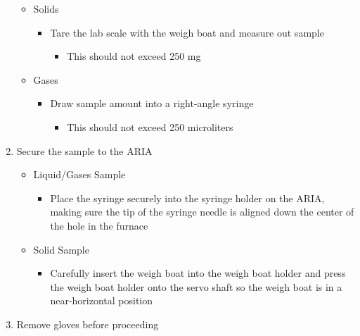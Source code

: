 \documentclass[letterpaper,11pt]{article}
\begin{document}
\begin{enumerate}
\begin{itemize}
        \item Solids
            \begin{itemize}
            \item Tare the lab scale with the weigh boat and measure out sample
                \begin{itemize}
                \item This should not exceed 250 mg
                \end{itemize}
            \end{itemize}
            
        \item Gases
            \begin{itemize}
            \item Draw sample amount into a right-angle syringe  
                \begin{itemize}
                \item This should not exceed 250 microliters
                \end{itemize}
            \end{itemize}
            
        \end{itemize}

     \item Secure the sample to the ARIA
		\begin{itemize}
		\item Liquid/Gases Sample
			\begin{itemize}
			\item Place the syringe securely into the syringe holder on the 
                ARIA, making sure the tip of the syringe 
                needle is aligned down the center of the hole in the furnace
			\end{itemize}
			
		\item Solid Sample
			\begin{itemize}
			\item Carefully insert the weigh boat into the weigh boat holder and
                press the weigh boat holder onto the servo shaft so the weigh 
                boat is in a near-horizontal position
			\end{itemize}
			
		\end{itemize}
			
	\item Remove gloves before proceeding
    

\end{enumerate}
\end{document}
